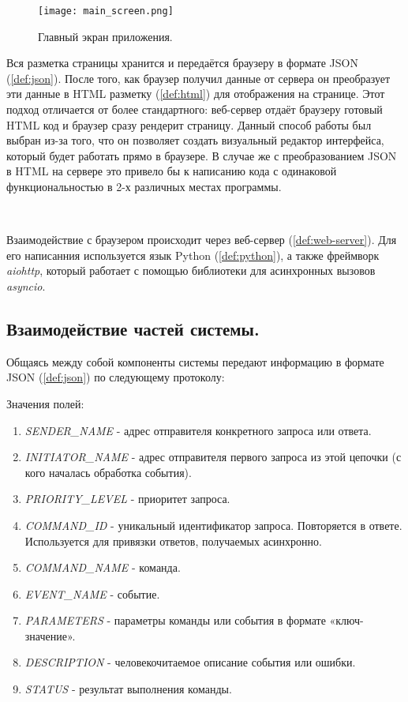 \begin{figure}[h]
    \centering
    \texttt{[image: main\_screen.png]}
    \caption{Главный экран приложения.}
    \label{fig:main_screen}
\end{figure}

\noindent Вся разметка страницы хранится и передаётся браузеру в формате JSON (\ref{def:json}). После того, как браузер
получил данные от сервера он преобразует эти данные в HTML разметку (\ref{def:html}) для отображения на странице. Этот подход
отличается от более стандартного: веб-сервер отдаёт браузеру готовый HTML код и браузер сразу рендерит страницу.
Данный способ работы был выбран из-за того, что он позволяет создать визуальный редактор интерфейса, который будет работать
прямо в браузере. В случае же с преобразованием JSON в HTML на сервере это привело бы к написанию кода с одинаковой
функциональностью в 2-х различных местах программы.

~\

Взаимодействие с браузером происходит через веб-сервер (\ref{def:web-server}). Для его написанния используется язык
Python (\ref{def:python}), а также фреймворк \textit{aiohttp}, который работает с помощью библиотеки для асинхронных вызовов
\textit{asyncio}.

\subsection{Взаимодействие частей системы.}

Общаясь между собой компоненты системы передают информацию в формате JSON (\ref{def:json}) по следующему протоколу:


Значения полей:
\begin{enumerate}
    \item \textit{SENDER\_NAME} - адрес отправителя конкретного запроса или ответа.
    \item \textit{INITIATOR\_NAME} - адрес отправителя первого запроса из этой цепочки (с кого началась обработка события).
    \item \textit{PRIORITY\_LEVEL} - приоритет запроса.
    \item \textit{COMMAND\_ID} - уникальный идентификатор запроса. Повторяется в ответе.
    Используется для привязки ответов, получаемых асинхронно.
    \item \textit{COMMAND\_NAME} - команда.
    \item \textit{EVENT\_NAME} - событие.
    \item \textit{PARAMETERS} - параметры команды или события в формате «ключ-значение».
    \item \textit{DESCRIPTION} - человекочитаемое описание события или ошибки.
    \item \textit{STATUS} - результат выполнения команды.
\end{enumerate}


